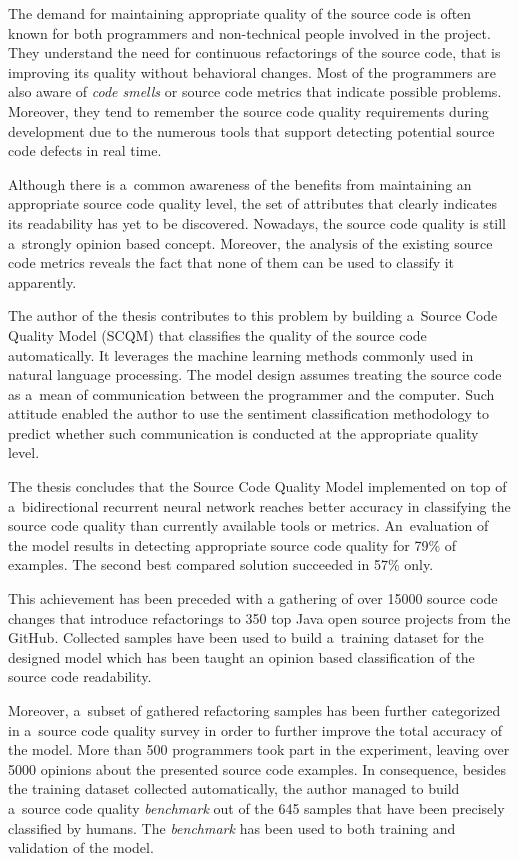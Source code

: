 \documentclass[twoside]{praca}
\begin{document}
The demand for maintaining appropriate quality of the source code is often known for both programmers and non-technical people involved in the project. They understand the need for continuous refactorings of the source code, that is improving its quality without behavioral changes. Most of the programmers are also aware of \textit{code smells} or source code metrics that indicate possible problems. Moreover, they tend to remember the source code quality requirements during development due to the numerous tools that support detecting potential source code defects in real time.

Although there is a~common awareness of the benefits from maintaining an appropriate source code quality level, the set of attributes that clearly indicates its readability has yet to be discovered. Nowadays, the source code quality is still a~strongly opinion based concept. Moreover, the analysis of the existing source code metrics reveals the fact that none of them can be used to classify it apparently.

The author of the thesis contributes to this problem by building a~Source Code Quality Model (SCQM) that classifies the quality of the source code automatically. It leverages the machine learning methods commonly used in natural language processing. The model design assumes treating the source code as a~mean of communication between the programmer and the computer. Such attitude enabled the author to use the sentiment classification methodology to predict whether such communication is conducted at the appropriate quality level.

The thesis concludes that the Source Code Quality Model implemented on top of a~bidirectional recurrent neural network reaches better accuracy in classifying the source code quality than currently available tools or metrics. An~evaluation of the model results in detecting appropriate source code quality for 79\% of examples. The second best compared solution succeeded in 57\% only.

This achievement has been preceded with a gathering of over 15000 source code changes that introduce refactorings to 350 top Java open source projects from the GitHub. Collected samples have been used to build a~training dataset for the designed model which has been taught an opinion based classification of the source code readability.

Moreover, a~subset of gathered refactoring samples has been further categorized in a~source code quality survey in order to further improve the total accuracy of the model. More than 500 programmers took part in the experiment, leaving over 5000 opinions about the presented source code examples. In consequence, besides the training dataset collected automatically, the author managed to build a~source code quality \textit{benchmark} out of the 645 samples that have been precisely classified by humans. The \textit{benchmark} has been used to both training and validation of the model.
\end{document}
